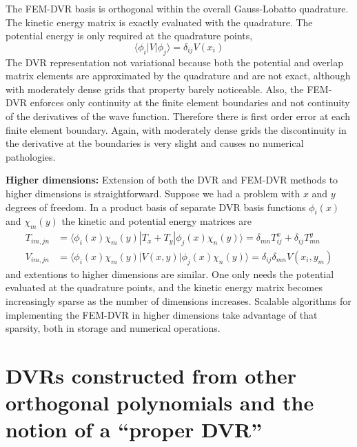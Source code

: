 \documentclass[aps,amssymb,superscriptaddress,floatfix]{revtex4}
\begin{document}
The FEM-DVR basis is orthogonal within the overall Gauss-Lobatto quadrature.  The kinetic energy matrix is exactly evaluated with the quadrature.  The potential energy is only required at the quadrature points,
\begin{equation}
\langle \phi_i |V|\phi_j \rangle = \delta_{ij}V(x_i)
\end{equation}
The DVR representation not variational because both the potential and overlap matrix elements are approximated by the quadrature and are not exact, although with moderately dense grids that property barely noticeable.  Also, the FEM-DVR  enforces only continuity at the finite element boundaries and not continuity of the derivatives of the wave function.  Therefore there is first order error at each finite element boundary.  Again, with moderately dense grids the discontinuity in the derivative at the boundaries is very slight and causes no numerical pathologies.

\textbf{Higher dimensions:} Extension of both the DVR and FEM-DVR methods to higher dimensions is straightforward.  Suppose we had a problem with $x$ and $y$ degrees of freedom.  In a product basis of separate DVR basis functions $\phi_i(x)$ and $\chi_m(y)$ the kinetic and potential energy matrices are
\begin{equation}
\begin{split}
T_{im,jn} &=\langle \phi_i(x) \chi_m(y) |T_x + T_y| \phi_j(x) \chi_n(y) \rangle = \delta_{mn}T^x_{ij} +\delta_{ij}T^y_{mn}  \\
V_{im,jn} &= \langle \phi_i(x) \chi_m(y) |V(x,y) | \phi_j(x) \chi_n(y) \rangle = \delta_{ij} \delta_{mn} V(x_i,y_m)
\end{split}
\end{equation}
and extentions to higher dimensions are similar.  One only needs the potential evaluated at the quadrature points, and the kinetic energy matrix becomes increasingly sparse as the number of dimensions increases.  Scalable algorithms for implementing the FEM-DVR in higher dimensions take advantage of that sparsity, both in storage and numerical operations.

\section{DVRs constructed from other orthogonal polynomials and the notion of a ``proper DVR''}
\end{document}
